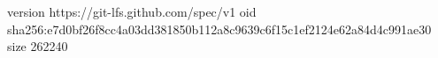 version https://git-lfs.github.com/spec/v1
oid sha256:e7d0bf26f8cc4a03dd381850b112a8c9639c6f15c1ef2124e62a84d4c991ae30
size 262240
